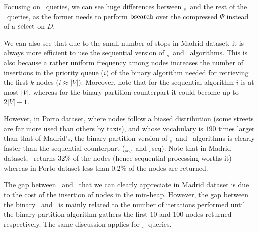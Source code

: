 

	Focusing on \topK\ queries, we can see huge differences between \topK$_s$\  
	and the rest of the \topK\ queries, as the former needs to perform {$ \operatorname{bsearch}$} over the compressed $\Psi$
	instead of a $\operatorname{select}$ on $D$. 

	We can also see that due to the small number of stops in Madrid dataset, it is always more efficient 
	to use the sequential version of \topK$_s$\ and \topK\ algorithms. This is also because a rather uniform frequency among nodes 
	increases the number of insertions in the priority queue ($i$) of the binary algorithm
	needed for retrieving the first $k$ nodes ($i \approx |V|$). Moreover, note that for the sequential algorithm 
	$i$ is  at most $|V|$, whereas for the binary-partition counterpart it could become up to $2|V|-1$.


	However, in Porto dataset, where nodes follow a biased distribution (some streets are far more used than others
	by taxis), and whose vocabulary 
	is $190$ times larger than that of Madrid's, the binary-partition version of \topK$_s$\ and \topK\ algorithms is clearly
	faster than the sequential counterpart (\topK$_{seq}$\ and \topK$_s$seq).
	Note that in Madrid dataset, \Stcien\ returns 32\% of the nodes (hence sequential processing worths it) 
	whereas in Porto dataset less than 0.2\% of the nodes are returned. 

	The gap between \Stdiezseq\ and \Stcienseq\ that we can clearly appreciate in Madrid dataset 
	is due to the cost of the insertion of nodes in the min-heap. However, the gap between 
	the binary \Stdiez\ and \Stcien\ 
	is mainly related to the number of iterations performed until the binary-partition algorithm gathers the first
	$10$ and $100$ {nodes}  returned respectively. The same discussion applies for \topK$_s$\ queries.






